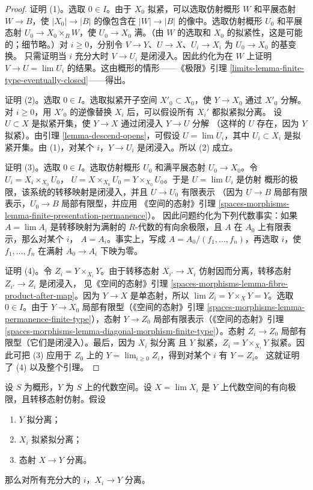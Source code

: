 \begin{proof}
证明 (1)。选取 $0\in I$。由于 $X_0$ 拟紧，可以选取仿射概形 $W$
和平展态射 $W\to B$，使 $|X_0|\to|B|$ 的像包含在
$|W|\to|B|$ 的像中。选取仿射概形 $U_0$ 和平展态射
$U_0\to X_0\times_BW$，使 $U_0\to X_0$ 满。（由 $W$ 的选取和
$X_0$ 的拟紧性，这是可能的；细节略。）对 $i\geq0$，分别令
$V\to Y$、$U\to X$、$U_i\to X_i$ 为 $U_0\to X_0$ 的基变换。
只需证明当 $i$ 充分大时 $V\to U_i$ 是闭浸入。因此约化为在 $W$
上证明 $V\to U=\lim U_i$ 的结果。这由概形的情形——《极限》引理
\ref{limits-lemma-finite-type-eventually-closed}——得出。

\medskip\noindent
证明 (2)。选取 $0\in I$。选取拟紧开子空间 $X'_0\subset X_0$，使
$Y\to X_0$ 通过 $X'_0$ 分解。对 $i\geq0$，用 $X'_0$ 的逆像替换
$X_i$ 后，可以假设所有 $X_i'$ 都拟紧拟分离。%
设 $U\subset X$ 是拟紧开集，使 $Y\to X$ 通过闭浸入 $Y\to U$ 分解
（这样的 $U$ 存在，因为 $Y$ 拟紧）。由引理
\ref{lemma-descend-opens}，可假设 $U=\lim U_i$，其中
$U_i\subset X_i$ 是拟紧开集。由 (1)，对某个 $i$，$Y\to U_i$
是闭浸入。所以 (2) 成立。

\medskip\noindent
证明 (3)。选取 $0\in I$。选取仿射概形 $U_0$ 和满平展态射
$U_0\to X_0$。令 $U_i=X_i\times_{X_0}U_0$，
$U=X\times_{X_0}U_0=Y\times_{X_0}U_0$。于是 $U=\lim U_i$ 是仿射
概形的极限，该系统的转移映射是闭浸入，并且 $U\to U_0$ 有限表示
（因为 $U\to B$ 局部有限表示，$U_0\to B$ 局部有限型，并应用
《空间的态射》引理
\ref{spaces-morphisms-lemma-finite-presentation-permanence}）。
因此问题约化为下列代数事实：如果 $A=\lim A_i$ 是转移映射为满射的
$R$-代数的有向余极限，且 $A$ 在 $A_0$ 上有限表示，那么对某个 $i$，
$A=A_i$。事实上，写成 $A=A_0/(f_1,\ldots,f_n)$，再选取 $i$，使
$f_1,\ldots,f_n$ 在满射 $A_0\to A_i$ 下映为零。

\medskip\noindent
证明 (4)。令 $Z_i=Y\times_{X_i}Y$。由于转移态射
$X_{i'}\to X_i$ 仿射因而分离，转移态射 $Z_{i'}\to Z_i$ 是闭浸入，
见《空间的态射》引理
\ref{spaces-morphisms-lemma-fibre-product-after-map}。因为 $Y\to X$
是单态射，所以 $\lim Z_i=Y\times_XY=Y$。选取 $0\in I$。由于
$Y\to X_0$ 局部有限型（《空间的态射》引理
\ref{spaces-morphisms-lemma-permanence-finite-type}），态射 $Y\to Z_0$
局部有限表示（《空间的态射》引理
\ref{spaces-morphisms-lemma-diagonal-morphism-finite-type}）。态射
$Z_i\to Z_0$ 局部有限型（它们是闭浸入）。最后，因为 $X_i$ 拟分离
且 $Y$ 拟紧，$Z_i=Y\times_{X_i}Y$ 拟紧。因此可把 (3) 应用于
$Z_0$ 上的 $Y=\lim_{i\geq0}Z_i$，得到对某个 $i$ 有 $Y=Z_i$。
这就证明了 (4) 以及整个引理。
\end{proof}

\begin{lemma}
\label{lemma-eventually-separated}
设 $S$ 为概形，$Y$ 为 $S$ 上的代数空间。设 $X=\lim X_i$ 是 $Y$
上代数空间的有向极限，且转移态射仿射。假设
\begin{enumerate}
\item $Y$ 拟分离；
\item $X_i$ 拟紧拟分离；
\item 态射 $X\to Y$ 分离。
\end{enumerate}
那么对所有充分大的 $i$，$X_i\to Y$ 分离。
\end{lemma}

